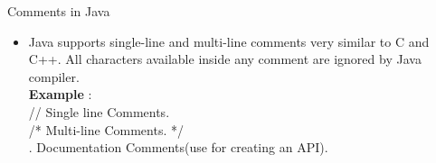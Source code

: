 \documentclass{beamer}
\begin{document}
\begin{frame}{Comments in Java}
	\begin{itemize}
	\item 	
Java supports single-line and multi-line comments very similar to C and C++. All characters available inside any comment are ignored by Java compiler.\\
           \textbf{Example}  : \\ // Single line Comments. \\
                             /* Multi-line Comments. */ \\.	  
                             Documentation Comments(use for creating an API).

    
    \end{itemize}
\end{frame}
\end{document}
